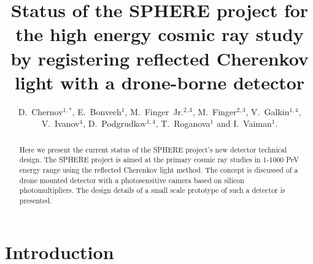 \documentclass[a4paper]{jpconf}
\begin{document}
\linenumbers %
\newcommand{\todoi}[1]{\todo[inline]{\Russian #1}}

\title{Status of the SPHERE project for the high energy cosmic ray study by registering reflected Cherenkov light with a drone-borne detector}

\author[1]{D.~Chernov$^{1,\ast}$, 
E.~Bonvech$^{1}$, 
M.~Finger~Jr.$^{2,3}$, 
M.~Finger$^{2,3}$,
V.~Galkin$^{1,4}$, 
V.~Ivanov$^{4}$, 
D.~Podgrudkov$^{1,4}$, 
T.~Roganova$^{1}$ 
and I.~Vaiman$^{1}$.}

\address{$^1$ Lomonosov Moscow State University, Skobeltsyn Institute for Nuclear Physics, Moscow, Russian Federation}
\address{$^2$ Charles University, Faculty of Mathematics and Physics, 18000 Prague, Czech Republic}
\address{$^3$ Joint Institute for Nuclear Research, Dubna, Russian Federation}
\address{$^4$ Lomonosov Moscow State University, Faculty of Physics, Moscow, Russian Federation}


\begin{abstract}

Here we present the current status of the SPHERE project’s new detector technical design. The SPHERE project is aimed at the primary cosmic ray studies in 1-1000 PeV energy range using the reflected Cherenkov light method. The concept is discussed of a drone mounted detector with a photosensitive camera based on silicon photomultipliers. The design details of a small scale prototype of such a detector is presented.    
\end{abstract}


\section{Introduction}
\label{sec:intro}

\end{document}
